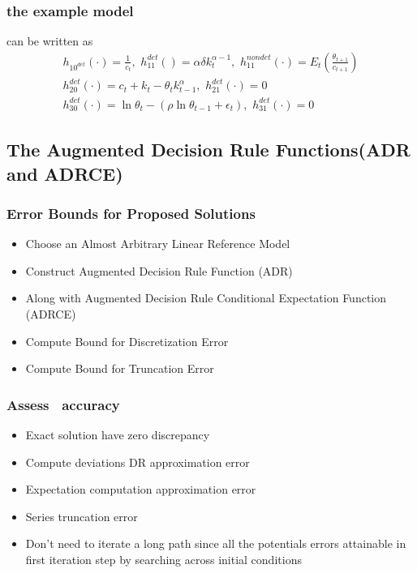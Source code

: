 \documentclass[tikz]{beamer}
\begin{document}
\begin{frame}
\frametitle{the example  model }
\label{sec:simple-rbc-model-ext} can be written as
\begin{gather}
h_{10^{det}}(\cdot)=\frac{1}{c_t},\,\,
h_{11}^{det}()=\alpha \delta k_{t}^{\alpha-1} ,\,\,
h_{11}^{nondet}(\cdot)=E_t \left (\frac{\theta_{t+1}}{c_{t+1}} \right )\\
h_{20}^{det}(\cdot)=c_t + k_t-\theta_tk_{t-1}^\alpha,\,\,
h_{21}^{det}(\cdot)=0\\
h_{30}^{det}(\cdot)=\ln \theta_t -(\rho \ln \theta_{t-1} + \epsilon_t),\,\,
h_{31}^{det}(\cdot)=0
\end{gather}

\end{frame}


\subsection{The Augmented Decision Rule Functions(ADR and ADRCE)}


  \begin{frame}
\frametitle{Error Bounds for Proposed Solutions}
    
\begin{itemize}
\item Choose an Almost  Arbitrary Linear Reference Model
\item Construct Augmented Decision Rule Function (ADR)
\item Along with Augmented Decision Rule Conditional Expectation Function (ADRCE)
\item Compute Bound for Discretization Error
\item Compute Bound for Truncation Error
\end{itemize}

  \end{frame}




\begin{frame}
  \frametitle{Assess \ADR\  accuracy}
  \begin{itemize}
  \item Exact solution have zero discrepancy
  \item Compute deviations  DR approximation error
  \item Expectation computation approximation error
  \item Series truncation error
  \item Don't need to iterate a long path since all the potentials 
errors attainable in first iteration step by searching across initial conditions
  \end{itemize}


\end{frame}
\end{document}
